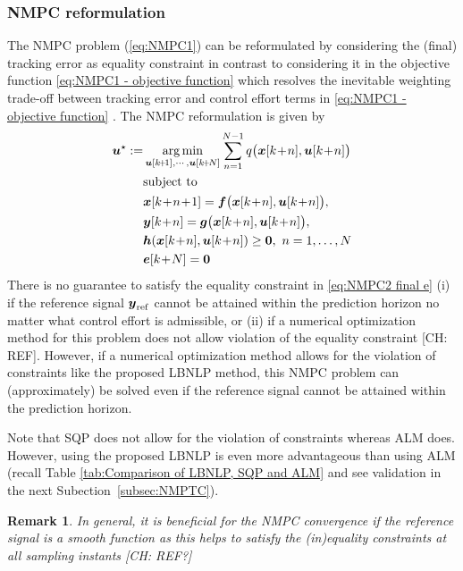 \documentclass[journal]{IEEEtranTIE}
\newtheorem{remark}{Remark}
\newcommand{\CHHA}[1]{{\color{red} [CH: #1]}} %
\begin{document}
\subsubsection{NMPC reformulation}
%
The NMPC problem (\ref{eq:NMPC1}) can be reformulated by considering the (final) tracking error as equality constraint in contrast to considering it in the objective function \eqref{eq:NMPC1 - objective function} which resolves the inevitable weighting trade-off between tracking error and control effort terms in \eqref{eq:NMPC1 - objective function} \cite{2013_Hackl_Ismultiple-objectivemodel-predictivecontroloptimal}. The NMPC reformulation is given by
%
\begin{subequations}\label{eq:NMPC2}
\begin{align}
\mv{u}^\star:=&\mathop {\rm arg\min }\limits_{\mv{u}[k\!+\!1], \cdots ,\mv{u}[k\!+\!N]}   \sum\limits_{n = 1}^{N - 1}  q\big( \mv{x}[k\!+\!n],\mv{u}[k\!+\!n] \big) \\
\nonumber
&{\rm{subject\ to}}\\
&\mv{x}[k\!+\!n\!+\!1] = \mv{f}\big( \mv{x}[k\!+\!n] ,\mv{u}[k\!+\!n] \big), \\ &\mv{y}[k\!+\!n]  = \mv{g}\big(\mv{x}[k\!+\!n], \mv{u}[k\!+\!n] \big), \\
&\mv{h}(\mv{x}[k\!+\!n],\mv{u}[k\!+\!n]) \ge \mv{0},\ n = 1, \ldots ,N\\
&\mv{e}[k\!+\!N] = \mv{0} \label{eq:NMPC2 final e}
\end{align}
\end{subequations}
%
There is no guarantee to satisfy the equality constraint in \eqref{eq:NMPC2 final e} (i) if the reference signal $\boldsymbol{y}_{\mathrm{ref}}$ cannot be attained within the prediction horizon no matter what control effort is admissible, or (ii) if a numerical optimization method for this problem does not allow violation of the equality constraint \CHHA{REF}. 
However, if a numerical optimization method allows for the violation of constraints like the proposed LBNLP method, this NMPC problem can (approximately) be solved even if the reference signal cannot be attained within the prediction horizon. 

Note that SQP does not allow for the violation of constraints whereas ALM does. However, using the proposed LBNLP is even more advantageous than using ALM (recall Table \ref{tab:Comparison of LBNLP, SQP and ALM} and see validation in the next Subection~\ref{subsec:NMPTC}).

\begin{remark}
In general, it is beneficial for the NMPC convergence if the reference signal is a smooth function as this helps to satisfy the (in)equality constraints at all sampling instants \CHHA{REF?}
\end{remark}
\end{document}
